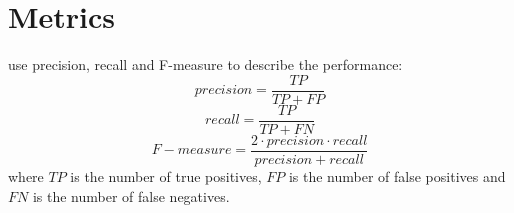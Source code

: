 \section{Metrics}
\label{sec:metrics}

\citet{chen_web_2008} use precision, recall and F-measure to describe the performance:
$$precision = \frac{TP}{TP + FP}$$
$$recall = \frac{TP}{TP + FN}$$
$$F-measure = \frac{2 \cdot precision \cdot recall}{precision + recall}$$
where $TP$ is the number of true positives, $FP$ is the number of false positives 
and $FN$ is the number of false negatives.
